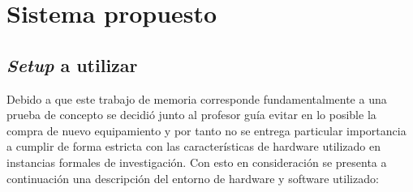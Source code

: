 \documentclass[\main/main.tex]{subfiles}
\begin{document}
\chapter{Sistema propuesto}
\label{cha:03_sistema_propuesto}

\section{\textit{Setup} a utilizar}
\label{sec:03_setup}
	Debido a que este trabajo de memoria corresponde fundamentalmente a una prueba de concepto se decidió junto al profesor guía evitar en lo posible la compra de nuevo equipamiento y por tanto no se entrega particular importancia a cumplir de forma estricta con las características de hardware utilizado en instancias formales de investigación. Con esto en consideración se presenta a continuación una descripción del entorno de hardware y software utilizado:
	\begin{table}[H]\begin{center}\footnotesize{
		\caption{Hardware y software utilizado en el desarrollo.}
		\label{tbl:03_hs_selection}
	}\end{center}\end{table}
\end{document}
